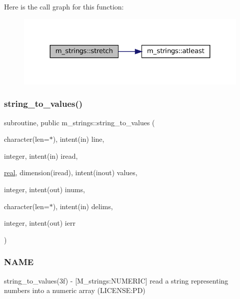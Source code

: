 Here is the call graph for this function\+:
\nopagebreak
\begin{figure}[H]
\begin{center}
\leavevmode
\includegraphics[width=324pt]{namespacem__strings_aa67b36ec70dbad84672d3069882929c5_cgraph}
\end{center}
\end{figure}
\mbox{\label{namespacem__strings_af3767887ce5c2373a6d9061ea6664bfc}} 
\subsubsection{\texorpdfstring{string\+\_\+to\+\_\+values()}{string\_to\_values()}}
{\footnotesize\ttfamily subroutine, public m\+\_\+strings\+::string\+\_\+to\+\_\+values (\begin{DoxyParamCaption}\item[{character(len=$\ast$), intent(in)}]{line,  }\item[{integer, intent(in)}]{iread,  }\item[{\mbox{\hyperlink{interfacem__strings_1_1real}{real}}, dimension(iread), intent(inout)}]{values,  }\item[{integer, intent(out)}]{inums,  }\item[{character(len=$\ast$), intent(in)}]{delims,  }\item[{integer, intent(out)}]{ierr }\end{DoxyParamCaption})}



\subsubsection*{N\+A\+ME}

string\+\_\+to\+\_\+values(3f) -\/ \mbox{[}M\+\_\+strings\+:N\+U\+M\+E\+R\+IC\mbox{]} read a string representing numbers into a numeric array (L\+I\+C\+E\+N\+SE\+:PD) 

